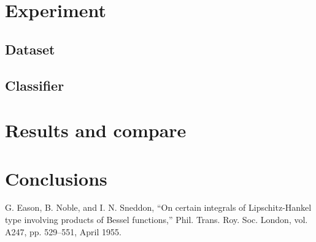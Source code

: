 \documentclass[conference]{IEEEtran}
\begin{document}
\section{Experiment}
\subsection{Dataset}
\subsection{Classifier}

\section{Results and compare}

\section{Conclusions}









\begin{thebibliography}{00}
 G. Eason, B. Noble, and I. N. Sneddon, ``On certain integrals of Lipschitz-Hankel type involving products of Bessel functions,'' Phil. Trans. Roy. Soc. London, vol. A247, pp. 529--551, April 1955.

\end{thebibliography}
\vspace{12pt}
\end{document}
